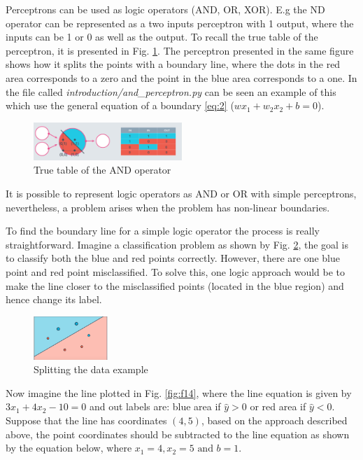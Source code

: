 \documentclass{article}
\begin{document}
Perceptrons can be used as logic operators (AND, OR, XOR). E.g the ND operator can be represented as a two inputs perceptron with 1 output, where the inputs can be 1 or 0 as well as the output. To recall the true table of the perceptron, it is presented in Fig. \ref{fig:f12}. The perceptron presented in the same figure shows how it splits the points with a boundary line, where the dots in the red area corresponds to a zero and the point in the blue area corresponds to a one. In the file called \textit{introduction/and\_perceptron.py} can be seen an example of this which use the general equation of a boundary \eqref{eq:2} (\(wx_1+w_2x_2+b=0\)). 

\begin{figure}[ht]
    \centering
    \includegraphics[width=0.5\textwidth,height=0.5\textheight,keepaspectratio]{images/and_table.png}
    \captionsetup{justification=centering}
    \caption{True table of the AND operator}
    \label{fig:f12}
\end{figure}

It is possible to represent logic operators as AND or OR with simple perceptrons, nevertheless, a problem arises when the problem has non-linear boundaries. 

To find the boundary line for a simple logic operator the process is really straightforward. Imagine a classification problem as shown by Fig. \ref{fig:f13}, the goal is to classify both the blue and red points correctly. However, there are one blue point and red point misclassified. To solve this, one logic approach would be to make the line closer to the misclassified points (located in the blue region) and hence change its label.

\begin{figure}[ht]
    \centering
    \includegraphics[width=0.25\textwidth,height=0.25\textheight,keepaspectratio]{images/split_data.png}
    \captionsetup{justification=centering}
    \caption{Splitting the data example}
    \label{fig:f13}
\end{figure}

Now imagine the line plotted in Fig. \ref{fig:f14}, where the line equation is given by \(3x_1+ 4x_2 - 10 = 0\) and out labels are: blue area if \(\hat{y} > 0\) or red area if \(\hat{y} < 0\). Suppose that the line has coordinates \((4,5)\), based on the approach described above, the point coordinates should be subtracted to the line equation as shown by the equation below, where \(x_1 = 4, x_2 = 5 \text{ and } b = 1\).
\end{document}
